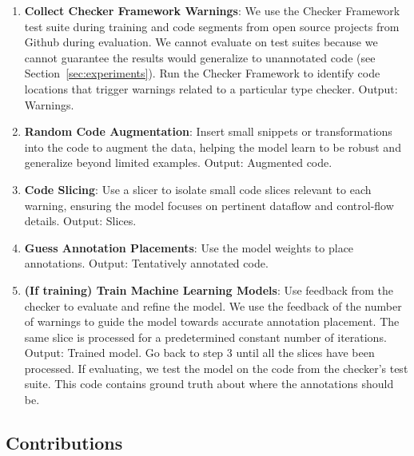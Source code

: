 \documentclass[acmsmall,screen,review,anonymous]{acmart}
\newcommand{\cf}{Checker Framework\xspace}
\begin{document}
\begin{enumerate}
    \item \textbf{Collect \cf Warnings}: We use the \cf test suite during training and code segments from open source projects from Github during evaluation. We cannot evaluate on test suites because we cannot guarantee the results would generalize to unannotated code (see Section~\ref{sec:experiments}). Run the \cf to identify code locations that trigger warnings related to a particular type checker. Output: Warnings.
    
    \item \textbf{Random Code Augmentation}: Insert small snippets or transformations into the code to augment the data, helping the model learn to be robust and generalize beyond limited examples. Output: Augmented code.
    
    \item \textbf{Code Slicing}: Use a slicer to isolate small code slices relevant to each warning, ensuring the model focuses on pertinent dataflow and control-flow details. Output: Slices.
    
    \item \textbf{Guess Annotation Placements}: Use the model weights to place annotations. Output: Tentatively annotated code.
    
    \item \textbf{(If training) Train Machine Learning Models}: Use feedback from the checker to evaluate and refine the model. We use the feedback of the number of warnings to guide the model towards accurate annotation placement. The same slice is processed for a predetermined constant number of iterations. Output: Trained model. Go back to step 3 until all the slices have been processed. If evaluating, we test the model on the code from the checker's test suite. This code contains ground truth about where the annotations should be.
\end{enumerate}

\subsection{Contributions}
\label{sec:contributions}
\end{document}
